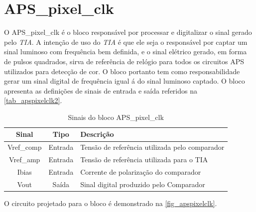 \renewcommand{\NomeBloco}{APS\_pixel\_clk}
\renewcommand{\NomeBlocoNoUnderline}{apspixelclk}
\renewcommand{\NomePTab}{tab_\NomeBlocoNoUnderline}
\renewcommand{\NomeSTab}{tab_\NomeBlocoNoUnderline2}
\renewcommand{\NomePFig}{fig_\NomeBlocoNoUnderline}
\renewcommand{\NomeSFig}{fig_\NomeBlocoNoUnderline2}
\renewcommand{\NomeTTab}{tab_\NomeBlocoNoUnderline3}
\renewcommand{\NomeQTab}{tab_\NomeBlocoNoUnderline4}

\section{\NomeBloco}

O \NomeBloco{} \'e o bloco respons\'avel por processar e digitalizar o sinal gerado pelo \emph{TIA}. A inten{\c c}\~ao de uso do \emph{TIA} \'e que ele seja o respons\'avel por captar um sinal luminoso com frequ\^encia bem definida, e o sinal el\'etrico gerado, em forma de pulsos quadrados, sirva de refer\^encia de rel\'ogio para todos os circuitos APS utilizados para detec{\c c}\~ao de cor. O bloco portanto tem como responsabilidade gerar um sinal digital de frequ\^encia igual \'a do sinal luminoso captado. O bloco apresenta as defini{\c c}\~oes de sinais de entrada e sa\'ida referidos na \autoref{\NomeSTab}.

\begin{table}[htbp]
\caption{Sinais do bloco \NomeBloco}
\label{\NomeSTab}
\centering
\begin{tabular}{ccl}

    \toprule
    Sinal & Tipo    & Descri{\c c}\~ao\\
    \midrule \midrule
    Vref\_comp   & Entrada   & Tens\~ao de refer\^encia utilizada pelo comparador\\
    \midrule
    Vref\_amp   & Entrada   & Tens\~ao de refer\^encia utilizada para o TIA\\
    \midrule
    Ibias   & Entrada   & Corrente de polariza{\c c}\~ao do comparador \\
    \midrule
    Vout   & Saída   & Sinal digital produzido pelo Comparador\\
    \bottomrule
\end{tabular}
\end{table}

O circuito projetado para o bloco \'e demonstrado na \autoref{\NomePFig}.

